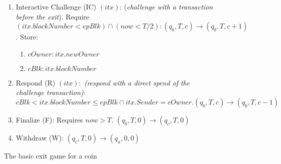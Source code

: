 \begin{figure}
\begin{minipage}{\columnwidth}
\begin{framed}
\begin{enumerate}
\begin{enumerate}
            \end{enumerate}
        \item Interactive Challenge (IC) $(itx)$: (\textit{challenge with a transaction before the exit}). Require $(itx.blockNumber < epBlk) \cap (now < T/2): (q_b, T, c) \rightarrow (q_b, T, c+1)$. Store: 
            \begin{enumerate}
                \item $cOwner: itx.newOwner$ 
                \item $cBlk: itx.blockNumber$ 
            \end{enumerate}
        \item Respond (R) $(itx):$ \textit{(respond with a direct spend of the challenge transaction)}: $cBlk < itx.blockNumber \leq epBlk \cap itx.Sender = cOwner. (q_b, T, c) \rightarrow (q_b, T, c-1)$
        \item Finalize (F): Requires $now > T$. $(q_b, T, 0) \rightarrow (q_c, T, 0)$
        \item Withdraw (W): $(q_c, T, 0) \rightarrow (q_a, 0, 0)$
    \end{enumerate}

\end{framed}
\end{minipage}
\caption{The basic exit game for a coin}
\label{fig:transfer_coin}
\end{figure}
